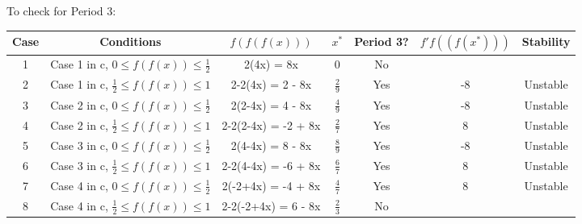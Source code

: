 \documentclass[12pt]{article}
\begin{document}
	\begin{table}[h!]
		\centering
		To check for Period 3:\\
		\bigskip
		\begin{tabular}{c|c||c|c|c|c|c}
			Case &Conditions & $f(f(f(x)))$ & $x^*$ & Period 3? & $f'f((f(x^*)))$ & Stability\\
			\hline
			1&Case 1 in c, $0\leq f(f(x)) \leq \frac{1}{2}$  & 2(4x) = 8x & 0 & No & & \\
			2&Case 1 in c, $\frac{1}{2} \leq f(f(x)) \leq 1$  & 2-2(4x) = 2 - 8x & $\frac{2}{9}$ & Yes &-8 & Unstable\\
			3&Case 2 in c, $0\leq f(f(x)) \leq \frac{1}{2}$  & 2(2-4x) = 4 - 8x & $\frac{4}{9}$ & Yes &-8 & Unstable \\
			4&Case 2 in c, $\frac{1}{2} \leq f(f(x)) \leq 1$  & 2-2(2-4x) = -2 + 8x & $\frac{2}{7}$& Yes &8 & Unstable \\
			5&Case 3 in c, $0\leq f(f(x)) \leq \frac{1}{2}$  & 2(4-4x) = 8 - 8x & $\frac{8}{9}$ & Yes &-8 & Unstable \\
			6&Case 3 in c, $\frac{1}{2} \leq f(f(x)) \leq 1$  & 2-2(4-4x) = -6 + 8x & $\frac{6}{7}$ & Yes &8 & Unstable \\
			7&Case 4 in c, $0\leq f(f(x)) \leq \frac{1}{2}$  & 2(-2+4x) = -4 + 8x & $\frac{4}{7}$ & Yes &8 & Unstable \\
			8&Case 4 in c, $\frac{1}{2} \leq f(f(x)) \leq 1$  & 2-2(-2+4x) = 6 - 8x & $\frac{2}{3}$ & No & & \\
		\end{tabular}
	\end{table}\\
\end{document}

